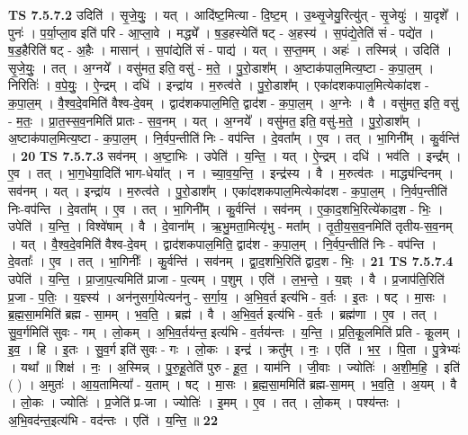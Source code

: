 \documentclass[17pt]{extarticle}
\begin{document}
                                \textbf{ TS 7.5.7.2} \newline
                  उदिति॑ । सृ॒जे॒युः॒ । यत् । आदि॑ष्ट॒मित्या - दि॒ष्ट॒म् । उ॒थ्सृ॒जेयु॒रित्यु॑त् - सृ॒जेयुः॑ । या॒दृशे᳚ । पुनः॑ । प॒र्या॒प्ला॒व इति॑ परि - आ॒प्ला॒वे । मद्ध्ये᳚ । ष॒ड॒हस्येति॑ षट् - अ॒हस्य॑ । स॒पंद्ये॒तेति॑ सं - पद्ये॑त । ष॒ड॒हैरिति॑ षट् - अ॒हैः । मासान्॑ । स॒पांद्येति॑ सं - पाद्य॑ । यत् । स॒प्त॒मम् । अहः॑ । तस्मिन्न्॑ । उदिति॑ । सृ॒जे॒युः॒ । तत् । अ॒ग्नये᳚ । वसु॑मत॒ इति॒ वसु॑ - म॒ते॒ । पु॒रो॒डाश᳚म् । अ॒ष्टाक॑पाल॒मित्य॒ष्टा - क॒पा॒ल॒म् । निरितिः॑ । व॒पे॒युः॒ । ऐ॒न्द्रम् । दधि॑ । इन्द्रा॑य । म॒रुत्व॑ते । पु॒रो॒डाश᳚म् । एका॑दशकपाल॒मित्येका॑दश - क॒पा॒ल॒म् । वै॒श्व॒दे॒वमिति॑ वैश्व-दे॒वम् । द्वाद॑शकपाल॒मिति॒ द्वाद॑श - क॒पा॒ल॒म् । अ॒ग्नेः । वै । वसु॑मत॒ इति॒ वसु॑ - म॒तः॒ । प्रा॒त॒स्स॒व॒नमिति॑ प्रातः - स॒व॒नम् । यत् । अ॒ग्नये᳚ । वसु॑मत॒ इति॒ वसु॑-म॒ते॒ । पु॒रो॒डाश᳚म् । अ॒ष्टाक॑पाल॒मित्य॒ष्टा - क॒पा॒ल॒म् । नि॒र्वप॒न्तीति॑ निः - वप॑न्ति । दे॒वता᳚म् । ए॒व । तत् । भा॒गिनी᳚म् । कु॒र्वन्ति॑ । \textbf{  20} \newline
                  \newline
                                \textbf{ TS 7.5.7.3} \newline
                  सव॑नम् । अ॒ष्टा॒भिः । उपेति॑ । य॒न्ति॒ । यत् । ऐ॒न्द्रम् । दधि॑ । भव॑ति । इन्द्र᳚म् । ए॒व । तत् । भा॒ग॒धेया॒दिति॑ भाग-धेया᳚त् । न । च्या॒व॒य॒न्ति॒ । इन्द्र॑स्य । वै । म॒रुत्व॑तः । माद्ध्य॑न्दिनम् । सव॑नम् । यत् । इन्द्रा॑य । म॒रुत्व॑ते । पु॒रो॒डाश᳚म् । एका॑दशकपाल॒मित्येका॑दश - क॒पा॒ल॒म् । नि॒र्वप॒न्तीति॑ निः-वप॑न्ति । दे॒वता᳚म् । ए॒व । तत् । भा॒गिनी᳚म् । कु॒र्वन्ति॑ । सव॑नम् । ए॒का॒द॒शभि॒रित्ये॑काद॒श - भिः॒ । उपेति॑ । य॒न्ति॒ । विश्वे॑षाम् । वै । दे॒वाना᳚म् । ऋ॒भु॒मता॒मित्यृ॑भु - मता᳚म् । तृ॒ती॒य॒स॒व॒नमिति॑ तृतीय-स॒व॒नम् । यत् । वै॒श्व॒दे॒वमिति॑ वैश्व-दे॒वम् । द्वाद॑शकपाल॒मिति॒ द्वाद॑श - क॒पा॒ल॒म् । नि॒र्वप॒न्तीति॑ निः - वप॑न्ति । दे॒वताः᳚ । ए॒व । तत् । भा॒गिनीः᳚ । कु॒र्वन्ति॑ । सव॑नम् । द्वा॒द॒शभि॒रिति॑ द्वाद॒श - भिः॒ । \textbf{  21} \newline
                  \newline
                                \textbf{ TS 7.5.7.4} \newline
                  उपेति॑ । य॒न्ति॒ । प्रा॒जा॒प॒त्यमिति॑ प्राजा - प॒त्यम् । प॒शुम् । एति॑ । ल॒भ॒न्ते॒ । य॒ज्ञ्ः । वै । प्र॒जाप॑ति॒रिति॑ प्र॒जा - प॒तिः॒ । य॒ज्ञ्स्य॑ । अन॑नुसर्गा॒येत्यन॑नु - स॒र्गा॒य॒ । अ॒भि॒व॒र्त इत्य॑भि - व॒र्तः । इ॒तः । षट् । मा॒सः । ब्र॒ह्म॒सा॒ममिति॑ ब्रह्म - सा॒मम् । भ॒व॒ति॒ । ब्रह्म॑ । वै । अ॒भि॒व॒र्त इत्य॑भि - व॒र्तः । ब्रह्म॑णा । ए॒व । तत् । सु॒व॒र्गमिति॑ सुवः - गम् । लो॒कम् । अ॒भि॒व॒र्तय॑न्त॒ इत्य॑भि - व॒र्तय॑न्तः । य॒न्ति॒ । प्र॒ति॒कू॒लमिति॑ प्रति - कू॒लम् । इ॒व॒ । हि । इ॒तः । सु॒व॒र्ग इति॑ सुवः - गः । लो॒कः । इन्द्र॑ । क्रतु᳚म् । नः॒ । एति॑ । भ॒र॒ । पि॒ता । पु॒त्रेभ्यः॑ । यथा᳚ ॥ शिक्ष॑ । नः॒ । अ॒स्मिन्न् । पु॒रु॒हू॒तेति॑ पुरु - हू॒त॒ । याम॑नि । जी॒वाः । ज्योतिः॑ । अ॒शी॒म॒हि॒ । इति॑ ( ) । अ॒मुतः॑ । आ॒य॒तामित्या᳚ - य॒ताम् । षट् । मा॒सः । ब्र॒ह्म॒सा॒ममिति॑ ब्रह्म-सा॒मम् । भ॒व॒ति॒ । अ॒यम् । वै । लो॒कः । ज्योतिः॑ । प्र॒जेति॑ प्र-जा । ज्योतिः॑ । इ॒मम् । ए॒व । तत् । लो॒कम् । पश्य॑न्तः । अ॒भि॒वद॑न्त॒इत्य॑भि - वद॑न्तः । एति॑ । य॒न्ति॒ ॥ \textbf{  22} \newline
\end{document}
